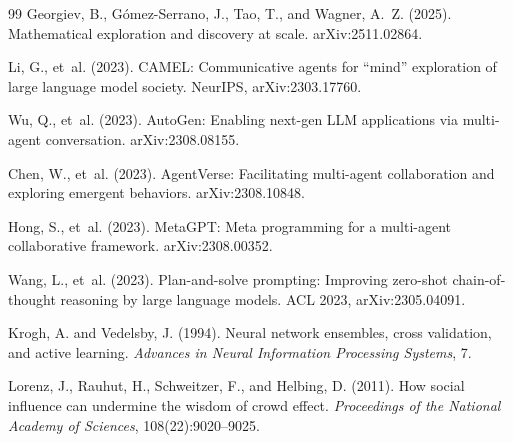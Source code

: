 \documentclass{article}
\begin{document}
\begin{thebibliography}{99}
Georgiev, B., G\'omez-Serrano, J., Tao, T., and Wagner, A.~Z. (2025).
Mathematical exploration and discovery at scale.
arXiv:2511.02864.

Li, G., et~al. (2023).
CAMEL: Communicative agents for ``mind'' exploration of large language model society.
NeurIPS, arXiv:2303.17760.

Wu, Q., et~al. (2023).
AutoGen: Enabling next-gen LLM applications via multi-agent conversation.
arXiv:2308.08155.

Chen, W., et~al. (2023).
AgentVerse: Facilitating multi-agent collaboration and exploring emergent behaviors.
arXiv:2308.10848.

Hong, S., et~al. (2023).
MetaGPT: Meta programming for a multi-agent collaborative framework.
arXiv:2308.00352.

Wang, L., et~al. (2023).
Plan-and-solve prompting: Improving zero-shot chain-of-thought reasoning by large language models.
ACL 2023, arXiv:2305.04091.

Krogh, A. and Vedelsby, J. (1994).
Neural network ensembles, cross validation, and active learning.
\emph{Advances in Neural Information Processing Systems}, 7.

Lorenz, J., Rauhut, H., Schweitzer, F., and Helbing, D. (2011).
How social influence can undermine the wisdom of crowd effect.
\emph{Proceedings of the National Academy of Sciences}, 108(22):9020--9025.

\end{thebibliography}
\end{document}
